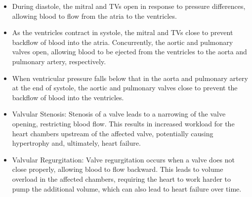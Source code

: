 \begin{itemize}
    \item During diastole, the mitral and \gls{TV}s open in response to pressure differences, allowing blood to flow from the atria to the ventricles.
    \item As the ventricles contract in systole, the mitral and \gls{TV}s close to prevent backflow of blood into the atria. Concurrently, the aortic and pulmonary valves open, allowing blood to be ejected from the ventricles to the aorta and pulmonary artery, respectively.
    \item When ventricular pressure falls below that in the aorta and pulmonary artery at the end of systole, the aortic and pulmonary valves close to prevent the backflow of blood into the ventricles.
\end{itemize}

\begin{itemize}
    \item Valvular Stenosis: Stenosis of a valve leads to a narrowing of the valve opening, restricting blood flow. This results in increased workload for the heart chambers upstream of the affected valve, potentially causing hypertrophy and, ultimately, heart failure.
    \item Valvular Regurgitation: Valve regurgitation occurs when a valve does not close properly, allowing blood to flow backward. This leads to volume overload in the affected chambers, requiring the heart to work harder to pump the additional volume, which can also lead to heart failure over time.
\end{itemize}

